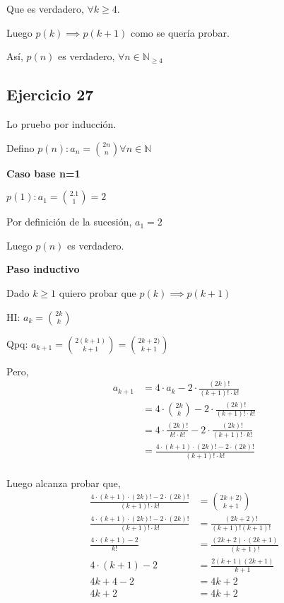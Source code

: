 Que es verdadero, $ \forall k \geq 4 $.

Luego $ p(k) \implies p(k+1) $ como se quería probar.

Así, $ p(n) $ es verdadero, $\forall n \in \mathbb{N}_{\geq 4} $

\subsection{Ejercicio 27}
Lo pruebo por inducción.

Defino $ p(n): a_n = \binom{2n}{n} \forall n \in \mathbb{N} $

\textbf{Caso base n=1}

$ p(1): a_1 = \binom{2.1}{1} = 2$

Por definición de la sucesión, $ a_1 = 2 $

Luego $ p(n) $ es verdadero.

\textbf{Paso inductivo}

Dado $ k \geq 1 $ quiero probar que $ p(k) \implies p(k+1) $

HI: $ a_k = \binom{2k}{k} $

Qpq: $a_{k+1} = \binom{2(k+1)}{k+1} = \binom{2k+2)}{k+1} $

Pero,
\begin{align*}
    a_{k+1} &= 4 \cdot a_k - 2 \cdot \frac{(2k)!}{(k+1)! \cdot k!} \\
    &= 4 \cdot \binom{2k}{k} - 2 \cdot \frac{(2k)!}{(k+1)! \cdot k!} \\
    &= 4 \cdot \frac{(2k)!}{k! \cdot k!} - 2 \cdot \frac{(2k)!}{(k+1)! \cdot k!} \\
    &= \frac{4\cdot (k+1)\cdot (2k)! - 2 \cdot (2k)!}{(k+1)! \cdot k!} \\
\end{align*}

Luego alcanza probar que,
\begin{align*}
    \frac{4\cdot (k+1)\cdot (2k)! - 2 \cdot (2k)!}{(k+1)! \cdot k!} &= \binom{2k+2)}{k+1} \\
    \frac{4\cdot (k+1)\cdot (2k)! - 2 \cdot (2k)!}{(k+1)! \cdot k!} &= \frac{(2k+2)!}{(k+1)!(k+1)!} \\
    \frac{4\cdot (k+1) - 2}{k!} &= \frac{(2k+2) \cdot (2k+1)}{(k+1)!} \\
    4\cdot (k+1) - 2 &= \frac{2(k+1)(2k+1)}{k+1} \\
    4k + 4 - 2 &= 4k + 2 \\
    4k + 2 &= 4k + 2 \\
\end{align*}

